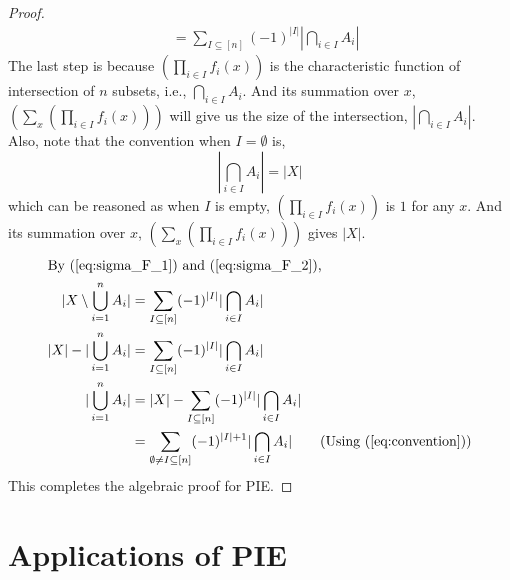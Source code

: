 \begin{proof}
\begin{align}
&=\sum_{I \subseteq [n]} (-1)^{|I|} |\bigcap_{i \in I}A_i|\label{eq:sigma_F_2}
\end{align}
The last step is because $(\prod_{i \in I} f_i(x))$ is the characteristic function of intersection of $n$ subsets, i.e., $\bigcap_{i \in I}A_i$. And its summation over $x$, $(\sum_{x} (\prod_{i \in I} f_i(x)))$ will give us the size of the intersection, $|\bigcap_{i \in I}A_i|$.\\
Also, note that the convention when $I=\emptyset$ is,
\begin{equation}
|\bigcap_{i \in I}A_i| = |X| \label{eq:convention}
\end{equation} which can be reasoned as when $I$ is empty, $(\prod_{i \in I} f_i(x))$ is $1$ for any $x$. And its summation over $x$, $(\sum_{x} (\prod_{i \in I} f_i(x)))$ gives $|X|$.
\begin{align*}
\intertext{By (\ref{eq:sigma_F_1}) and (\ref{eq:sigma_F_2}),}
|X \setminus \bigcup_{i=1}^{n}A_i| &= \sum_{I \subseteq [n]} (-1)^{|I|} |\bigcap_{i \in I}A_i|\\
|X | - | \bigcup_{i=1}^{n}A_i| &= \sum_{I \subseteq [n]} (-1)^{|I|} |\bigcap_{i \in I}A_i|\\
| \bigcup_{i=1}^{n}A_i| &= |X| - \sum_{I \subseteq [n]} (-1)^{|I|} |\bigcap_{i \in I}A_i|\\ 
&=\sum_{\emptyset \neq I \subseteq [n]} (-1)^{|I|+1} |\bigcap_{i \in I}A_i| \tag{Using (\ref{eq:convention})}\\
\end{align*}
This completes the algebraic proof for PIE.
\end{proof}


\section{Applications of PIE} \label{sec:Applications of PIE - lec1}

